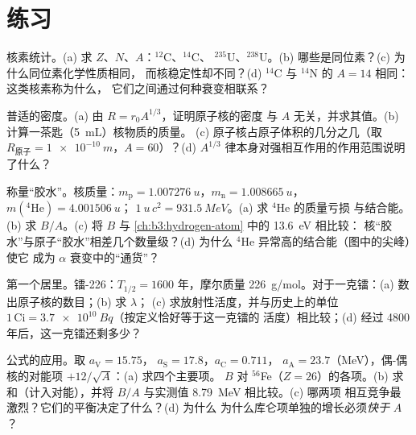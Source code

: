 \section{练习}

\begin{exercise}[$\star$]\label{exo:b3:nuclear-physics:1}
核素统计。(a) 求 $Z$、$N$、$A$：$^{12}$C、$^{14}$C、
$^{235}$U、$^{238}$U。(b) 哪些是同位素？(c) 为什么同位素化学性质相同，
而核稳定性却不同？(d) $^{14}$C 与 $^{14}$N 的 $A = 14$ 相同：
这类核素称为什么，
它们之间通过何种衰变相联系？
\end{exercise}

\begin{exercise}[$\star$]\label{exo:b3:nuclear-physics:2}
普适的密度。(a) 由 $R = r_0A^{1/3}$，证明原子核的密度
与 $A$ 无关，并求其值。(b)
计算一茶匙（\qty{5}{mL}）核物质的质量。
(c) 原子核占原子体积的几分之几（取
$R_{\text{原子}} = \qty{1e-10}{m}$，$A = 60$）？(d)
$A^{1/3}$ 律本身对强相互作用的作用范围说明了什么？
\end{exercise}

\begin{exercise}[$\star$]\label{exo:b3:nuclear-physics:3}
称量“胶水”。核质量：$m_{\text{p}} =
\qty{1.007276}{u}$，$m_{\text{n}} = \qty{1.008665}{u}$，
$m(^4\text{He}) = \qty{4.001506}{u}$；
$\qty{1}{u}\,c^2 = \qty{931.5}{MeV}$。(a) 求 $^4$He 的质量亏损
与结合能。(b) 求 $B/A$。(c)
将 $B$ 与 \cref{ch:b3:hydrogen-atom} 中的 \qty{13.6}{eV} 相比较：
核“胶水”与原子“胶水”相差几个数量级？(d) 为什么
$^4$He 异常高的结合能（图中的尖峰）使它
成为 $\alpha$ 衰变中的“通货”？
\end{exercise}

\begin{exercise}[$\star$]\label{exo:b3:nuclear-physics:4}
第一个居里。镭-226：$T_{1/2} = 1600$ 年，摩尔质量
\qty{226}{g/mol}。对于一克镭：(a) 数出原子核的数目；(b) 求 $\lambda$；
(c) 求放射性活度，并与历史上的单位
$1\,\text{Ci} = \qty{3.7e10}{Bq}$（按定义恰好等于这一克镭的
活度）相比较；(d) 经过 4800 年后，这一克镭还剩多少？
\end{exercise}

\begin{exercise}[$\star\star$]\label{exo:b3:nuclear-physics:5}
公式的应用。取 $a_{\text{V}} = 15.75$，
$a_{\text{S}} = 17.8$，$a_{\text{C}} = 0.711$，
$a_{\text{A}} = 23.7$（\unit{MeV}），偶-偶核的对能项
$+12/\sqrt A$：(a) 求四个主要项。
$B$ 对 $^{56}$Fe（$Z = 26$）的各项。(b) 求和（计入对能），并将
$B/A$ 与实测值 \qty{8.79}{MeV} 相比较。(c) 哪两项
相互竞争最激烈？它们的平衡决定了什么？(d) 为什么
为什么库仑项单独的增长必须\emph{快于} $A$？
\end{exercise}

